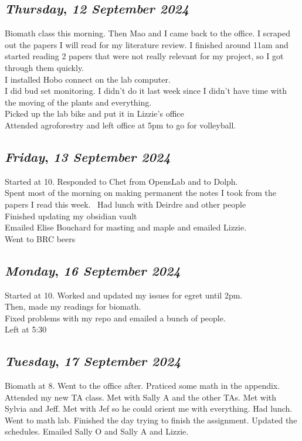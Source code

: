 \def\day{\textit{12 September 2024}}
\def\weekday{\textit{Thursday}}
\subsection*{\weekday, \day}
Biomath class this morning. Then Mao and I came back to the office. I scraped out the papers I will  read for my literature review. I finished around 11am and started reading 2 papers that were not really relevant for my project, so I got through them quickly. \\
I installed Hobo connect on the lab computer. \\
I did bud set monitoring. I didn't do it last week since I didn't have time with the moving of the plants and everything.\\
Picked up the lab bike and put it in Lizzie's office\\
Attended agroforestry and left office at 5pm to go for volleyball. 
 
\def\day{\textit{13 September 2024}}
\def\weekday{\textit{Friday}}
\subsection*{\weekday, \day}
Started at 10. Responded to Chet from OpensLab and to Dolph. \\
Spent most of the morning on making permanent the notes I took from the papers I read this week. \
Had lunch with Deirdre and other people\\
Finished updating my obsidian vault\\
Emailed Elise Bouchard for masting and maple and emailed Lizzie.\\
Went to BRC beers

\def\day{\textit{16 September 2024}}
\def\weekday{\textit{Monday}}
\subsection*{\weekday, \day}
Started at 10. Worked and updated my issues for egret until 2pm.\\
Then, made my readings for biomath.\\
Fixed problems with my repo and emailed a bunch of people. \\
Left at 5:30

\def\day{\textit{17 September 2024}}
\def\weekday{\textit{Tuesday}}
\subsection*{\weekday, \day}
Biomath at 8. Went to the office after. Praticed some math in the appendix. Attended my new TA class. Met with Sally A and the other TAs. Met with Sylvia and Jeff. Met with Jef so he could orient me with everything. Had lunch. Went to math lab. Finished the day trying to finish the assignment. Updated the schedules. Emailed Sally O and Sally A and Lizzie.

